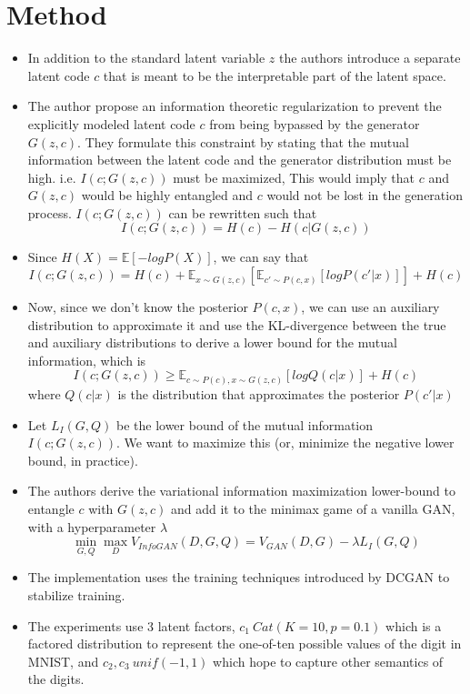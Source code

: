 \documentclass[12pt]{article}
\begin{document}
\section{Method}
  \begin{itemize}
    \item In addition to the standard latent variable $z$ the authors introduce a separate latent code $c$ that is meant to be the interpretable part of the latent space.
    \item The author propose an information theoretic regularization to prevent the explicitly modeled latent code $c$ from being bypassed by the generator $G(z,c)$. They formulate this constraint by stating that the mutual information between the latent code and the generator distribution must be high. i.e. $I(c; G(z,c))$ must be maximized, This would imply that $c$ and $G(z,c)$ would be highly entangled and $c$ would not be lost in the generation process. $I(c; G(z,c))$ can be rewritten such that $$I(c; G(z,c)) = H(c) - H(c|G(z,c))$$
    \item Since $H(X) = \mathbb{E}[-log P(X)]$, we can say that $$I(c; G(z,c)) = H(c) + \mathbb{E}_{x \sim G(z,c)}[\mathbb{E}_{c' \sim P(c,x)}[log P(c'|x)]] + H(c)$$
    \item Now, since we don't know the posterior $P(c,x)$, we can use an auxiliary distribution to approximate it and use the KL-divergence between the true and auxiliary distributions to derive a lower bound for the mutual information, which is $$I(c; G(z,c)) \geq \mathbb{E}_{c \sim P(c), x \sim G(z,c)}[log Q(c|x)] + H(c)$$ where $Q(c|x)$ is the distribution that approximates the posterior $P(c'|x)$
    \item Let $L_I(G,Q)$ be the lower bound of the mutual information $I(c; G(z,c))$. We want to maximize this (or, minimize the negative lower bound, in practice).
    \item The authors derive the variational information maximization lower-bound to entangle $c$ with $G(z,c)$ and add it to the minimax game of a vanilla GAN, with a hyperparameter $\lambda$$$\min_{G,Q} \max_D V_{InfoGAN}(D,G,Q) = V_{GAN}(D,G) - \lambda L_I(G,Q)$$
    \item The implementation uses the training techniques introduced by DCGAN \cite{radford2015unsupervised} to stabilize training.
    \item The experiments use 3 latent factors, $c_1 ~ Cat(K=10,p=0.1)$ which is a factored distribution to represent the one-of-ten possible values of the digit in MNIST, and $c_2,c_3 ~ unif(-1,1)$ which hope to capture other semantics of the digits.
  \end{itemize}
\end{document}
